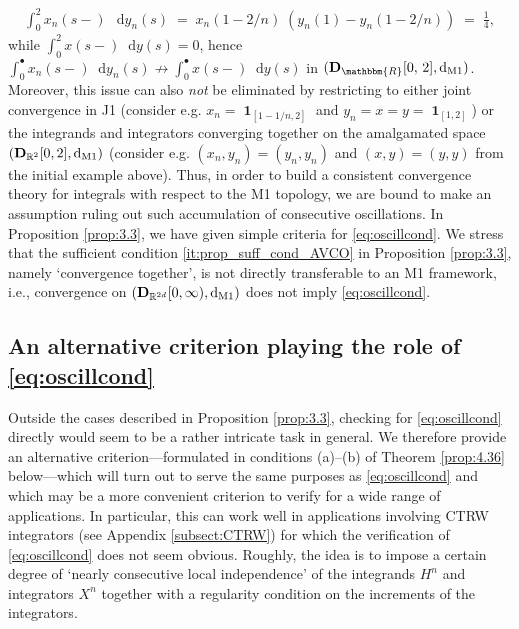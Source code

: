 \documentclass[11pt]{article}
\theoremstyle{definition}\newtheorem{example}[theorem]{Example}
\theoremstyle{definition}\newtheorem{counterexample}[theorem]{Counterexample}
\theoremstyle{definition}\newtheorem{remark}[theorem]{Remark}
\theoremstyle{definition}\newtheorem{defi}[theorem]{Definition}
\numberwithin{equation}{section}
\newcommand{\R}{\mathbb{R}}
\newcommand{\D}{{\bf D}}											%
\newcommand*\diff{\mathop{}\!\mathrm{d}}								%
\newcommand{\ind}{\operatorname{\mathbf{1}}}							%
\renewcommand{\|}{\; : \, \;}											%
\newcommand{\dM}{\diff_{\operatorname{M1}}}							%
\begin{document}
\begin{align*}
	\int_0^2 x_n(s-)\, \diff y_n(s) \; = \; x_n(1 - 2/n )\; \left( y_n(1) -y_n (1 - 2/n)\right)
	\; = \;  \frac 14,
\end{align*}
while $\int_0^2 x(s-)\diff y(s)=0$, hence $\int_0^\bullet x_n(s-)\diff y_n(s) \not\to \int_0^\bullet x(s-)\diff y(s)$ in $(\D_{\mathbbm{R}}[0,\,2],\diff_{\text{M1}})$. Moreover, this issue can also \emph{not} be eliminated by restricting to either joint convergence in J1 (consider e.g. $x_n=\ind_{[1-1/n,2]}$ and $y_n=x=y=\ind_{[1,2]}$) or the integrands and integrators converging together on the amalgamated space $(\D_{\R^2}[0,2],\dM)$ (consider e.g. $(x_n,y_n)=(y_n,y_n)$ and $(x,y)=(y,y)$ from the initial example above). Thus, in order to build a consistent convergence theory for integrals with respect to the M1 topology, we are bound to make an assumption ruling out such accumulation of consecutive oscillations. In Proposition \ref{prop:3.3}, we have given simple criteria for \eqref{eq:oscillcond}. We stress that the sufficient condition \ref{it:prop_suff_cond_AVCO} in Proposition \ref{prop:3.3}, namely `convergence together', is not directly transferable to an M1 framework, i.e., convergence on $(\D_{\R^{2d}}[0,\infty), \dM)$ does not imply \eqref{eq:oscillcond}. 

\subsection{An alternative criterion playing the role of \eqref{eq:oscillcond}}\label{subsect:alternative_criteria}

Outside the cases described in Proposition \ref{prop:3.3}, checking for \eqref{eq:oscillcond} directly would seem to be a rather intricate task in general. We therefore provide an alternative criterion---formulated in conditions (a)--(b) of Theorem \ref{prop:4.36} below---which will turn out to serve the same purposes as \eqref{eq:oscillcond} and which may be a more convenient criterion to verify for a wide range of applications. In particular, this can work well in applications involving CTRW integrators (see Appendix \ref{subsect:CTRW}) for which the verification of \eqref{eq:oscillcond} does not seem obvious. Roughly, the idea is to impose a certain degree of `nearly consecutive local independence' of the integrands $H^n$ and integrators $X^n$ together with a regularity condition on the increments of the integrators.
\end{document}

